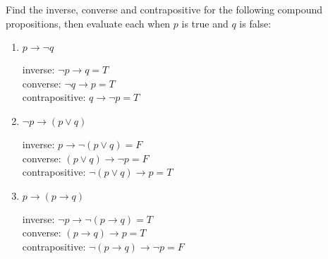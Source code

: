 \documentclass[]{exam}
\begin{document}
\begin{questions}
    \question Find the inverse, converse and contrapositive for the following
      compound propositions, then evaluate each when $p$ is true and $q$ is
      false:
      \begin{enumerate} 
        \item $p \rightarrow \lnot q$
          \begin{solution}
            inverse: $\lnot p \rightarrow q = T$\\
            converse: $\lnot q \rightarrow p = T$\\
            contrapositive: $q \rightarrow \lnot p = T$
          \end{solution}
        \item $\lnot p \rightarrow (p \lor q)$
          \begin{solution}
            inverse: $p \rightarrow \lnot (p \lor q) = F$\\
            converse: $(p \lor q) \rightarrow \lnot p = F$\\
            contrapositive: $\lnot (p \lor q) \rightarrow p = T$
          \end{solution}
        \item $p \rightarrow (p \rightarrow q)$
          \begin{solution}
            inverse: $\lnot p \rightarrow \lnot (p \rightarrow q) = T$\\
            converse: $(p \rightarrow q) \rightarrow p = T$\\
            contrapositive: $\lnot (p \rightarrow q) \rightarrow \lnot p = F$
          \end{solution}
      \end{enumerate}
  \end{questions}
\end{document}
